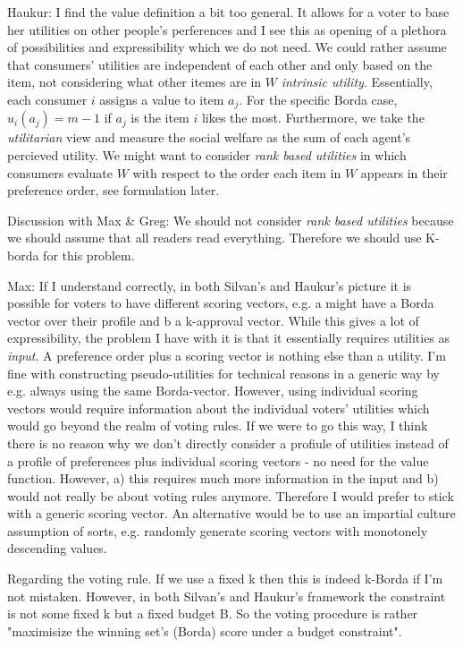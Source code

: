 \documentclass[10pt,a4paper]{article}
\begin{document}
Haukur: I find the value definition a bit too general. It allows for a voter to base her utilities on other people's perferences and I see this as opening of a plethora of possibilities and expressibility which we do not need. We could rather assume that consumers' utilities are independent of each other and only based on the item, not considering what other itemes are in $W$ \emph{intrinsic utility}. Essentially, each consumer $i$ assigns a value to item $a_j$. For the specific Borda case, $u_i(a_j)=m-1$ if $a_j$ is the item $i$ likes the most. Furthermore, we take the \emph{utilitarian} view and measure the social welfare as the sum of each agent's percieved utility. We might want to consider \emph{rank based utilities} in which consumers evaluate $W$ with respect to the order each item in $W$ appears in their preference order, see formulation later.

Discussion with Max \& Greg: We should not consider \emph{rank based utilities} because we should assume that all readers read everything. Therefore we should use K-borda for this problem.

Max: If I understand correctly, in both Silvan's and Haukur's picture it is possible for voters to have different scoring vectors, e.g. a
might have a Borda vector over their profile and b a k-approval vector. While this gives a lot of expressibility, the problem I have with
it is that it essentially requires utilities as \emph{input}. A preference order plus a scoring vector is nothing else than a utility.
I'm fine with constructing pseudo-utilities for technical reasons in a generic way by e.g. always using the same Borda-vector. However,
using individual scoring vectors would require information about the individual voters' utilities which would go beyond the realm of voting
rules. If we were to go this way, I think there is no reason why we don't directly consider a profiule of utilities instead of a profile of
preferences plus individual scoring vectors - no need for the value function. However, a) this requires much more information in the
input and b) would not really be about voting rules anymore. Therefore I would prefer to stick with a generic scoring vector. An
alternative would be to use an impartial culture assumption of sorts, e.g. randomly generate scoring vectors with monotonely descending
values.

Regarding the voting rule. If we use a fixed k then this is indeed k-Borda if I'm not mistaken. However, in both Silvan's and Haukur's
framework the constraint is not some fixed k but a fixed budget B. So the voting procedure is rather "maximisize the winning set's (Borda)
score under a budget constraint".
\end{document}
